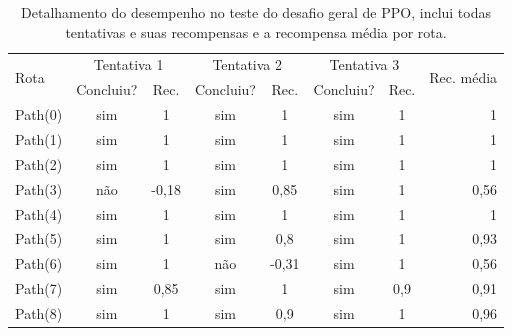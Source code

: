 \begin{table}[htpb]
    \centering
    \caption{Detalhamento do desempenho no teste do desafio geral de PPO, inclui todas tentativas e suas recompensas e a recompensa média por rota.}
    \label{resultado-tabela-geral-ppo}
    \begin{tabular}{|l|c|c|c|c|c|c|r|}
         \hline
         \multirow{2}{*}{Rota} & \multicolumn{2}{c|}{Tentativa 1}  & \multicolumn{2}{c|}{Tentativa 2} & \multicolumn{2}{c|}{Tentativa 3} & \multirow{2}{*}{Rec. média} \\ \cline{2-7}
                               & \small{Concluiu?}  & \small{Rec.} & \small{Concluiu?} &\small{Rec.} & \small{Concluiu?} &\small{Rec.} &                               \\ \hline
            Path(0)   &      sim        &   1             &    sim          &      1        &    sim          &      1        &      1                 \\ \hline
            Path(1)   &      sim        &   1             &    sim          &      1        &    sim          &      1        &      1                 \\ \hline
            Path(2)   &      sim        &   1             &    sim          &      1        &    sim          &      1        &      1                 \\ \hline
            Path(3)   &      não        &   -0,18         &    sim          &      0,85     &    sim          &      1        &      0,56              \\ \hline
            Path(4)   &      sim        &   1             &    sim          &      1        &    sim          &      1        &      1                 \\ \hline
            Path(5)   &      sim        &   1             &    sim          &      0,8      &    sim          &      1        &      0,93              \\ \hline
            Path(6)   &      sim        &   1             &    não          &      -0,31    &    sim          &      1        &      0,56              \\ \hline
            Path(7)   &      sim        &   0,85          &    sim          &      1        &    sim          &      0,9      &      0,91              \\ \hline
            Path(8)   &      sim        &   1             &    sim          &      0,9      &    sim          &      1        &      0,96              \\ \hline

\end{tabular}
\end{table}
